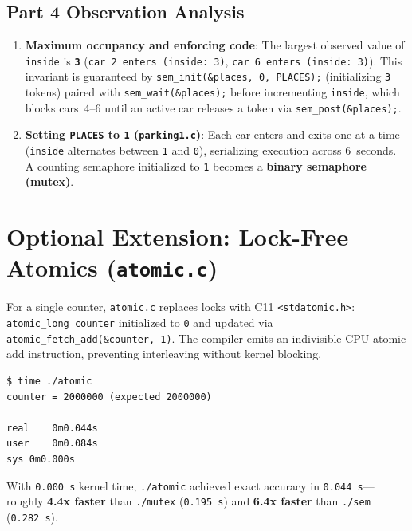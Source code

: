 \documentclass[12pt,a4paper]{article}
\begin{document}
\subsection{Part 4 Observation Analysis}
\begin{enumerate}
    \item \textbf{Maximum occupancy and enforcing code}: The largest observed value of \texttt{inside} is \textbf{\texttt{3}} (\texttt{car 2 enters (inside: 3)}, \texttt{car 6 enters (inside: 3)}). This invariant is guaranteed by \texttt{sem\_init(\&places, 0, PLACES);} (initializing \texttt{3} tokens) paired with \texttt{sem\_wait(\&places);} before incrementing \texttt{inside}, which blocks cars~4--6 until an active car releases a token via \texttt{sem\_post(\&places);}.
    \item \textbf{Setting \texttt{PLACES} to \texttt{1} (\texttt{parking1.c})}: Each car enters and exits one at a time (\texttt{inside} alternates between \texttt{1} and \texttt{0}), serializing execution across 6~seconds. A counting semaphore initialized to \texttt{1} becomes a \textbf{binary semaphore (mutex)}.
\end{enumerate}

\section{Optional Extension: Lock-Free Atomics (\texttt{atomic.c})}

For a single counter, \texttt{atomic.c} replaces locks with C11 \texttt{<stdatomic.h>}: \texttt{atomic\_long counter} initialized to \texttt{0} and updated via \texttt{atomic\_fetch\_add(\&counter, 1)}. The compiler emits an indivisible CPU atomic add instruction, preventing interleaving without kernel blocking.

\begin{lstlisting}[style=consolestyle]
$ time ./atomic
counter = 2000000 (expected 2000000)

real	0m0.044s
user	0m0.084s
sys	0m0.000s
\end{lstlisting}

With \texttt{0.000\,s} kernel time, \texttt{./atomic} achieved exact accuracy in \texttt{0.044\,s}---roughly \textbf{4.4x faster} than \texttt{./mutex} (\texttt{0.195\,s}) and \textbf{6.4x faster} than \texttt{./sem} (\texttt{0.282\,s}).
\end{document}
